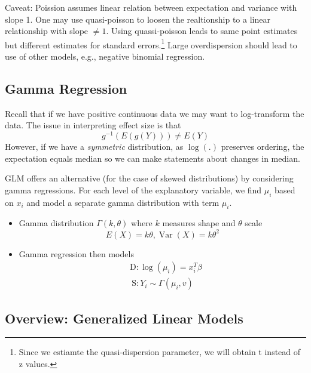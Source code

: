 \documentclass[11pt, %
	oneside, %
	english, %
	onehalfspacing, %
	]{article} %
\numberwithin{equation}{section}
\begin{document}
Caveat: Poission assumes linear relation between expectation and variance with slope 1. One may use quasi-poisson to loosen the realtionship to a linear relationship with slope $\neq 1$. Using quassi-poisson leads to same point estimates but different estimates for standard errors.\footnote{Since we estiamte the quasi-dispersion parameter, we will obtain t instead of z values.} Large overdispersion should lead to use of other models, e.g., negative binomial regression.

\subsection{Gamma Regression}

Recall that if we have positive continuous data we may want to log-transform the data. The issue in interpreting effect size is that
\begin{equation*}
    g^{-1}(E(g(Y))) \neq E(Y)
\end{equation*}
However, if we have a \emph{symmetric} distribution, as $\log(.)$ preserves ordering, the expectation equals median so we can make statements about changes in median.

GLM offers an alternative (for the case of skewed distributions) by considering gamma regressions. For each level of the explanatory variable, we find $\mu_i$ based on $x_i$ and model a separate gamma distribution with term $\mu_i$.

\begin{itemize}
    \item Gamma distribution $\Gamma(k, \theta)$ where $k$ measures shape and $\theta$ scale
    \begin{equation*}
        E(X)=k \theta, \operatorname{Var}(X)=k \theta^2
    \end{equation*}
    \item Gamma regression then models
    \begin{equation*}
        \begin{aligned}
            & \mathrm{D}: \log \left(\mu_i\right)=x_i^T \beta \\
            & \mathrm{~S}: Y_i \sim \Gamma\left(\mu_i, v\right)
            \end{aligned}
    \end{equation*}
\end{itemize}


\subsection{Overview: Generalized Linear Models}
\end{document}
